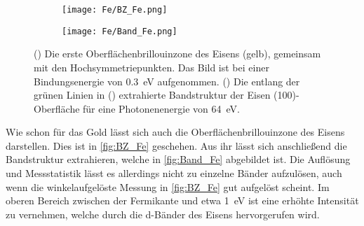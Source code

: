         \begin{figure}
            \begin{subfigure}[t]{0.34\textwidth}
                \centering
                \texttt{[image: Fe/BZ\_Fe.png]}
                \subcaption{}
                \label{fig:BZ_Fe}
            \end{subfigure}
            \begin{subfigure}[t]{0.62\textwidth}
                \centering
                \texttt{[image: Fe/Band\_Fe.png]}
                \subcaption{}
                \label{fig:Band_Fe}
            \end{subfigure}
            \caption{() Die erste Oberflächenbrillouinzone des Eisens (gelb), gemeinsam mit den Hochsymmetriepunkten. Das Bild ist bei einer Bindungsenergie von \SI{0.3}{\electronvolt} aufgenommen.
            () Die entlang der grünen Linien in () extrahierte Bandstruktur der Eisen (100)-Oberfläche für eine Photonenenergie von \SI{64}{\electronvolt}.}
        \end{figure}
        Wie schon für das Gold lässt sich auch die Oberflächenbrillouinzone des Eisens darstellen. 
        Dies ist in \autoref{fig:BZ_Fe} geschehen.
        Aus ihr lässt sich anschließend die Bandstruktur extrahieren, welche in \autoref{fig:Band_Fe} abgebildet ist.
        Die Auflösung und Messstatistik lässt es allerdings nicht zu einzelne Bänder aufzulösen, auch wenn die winkelaufgelöste Messung in \autoref{fig:BZ_Fe} gut aufgelöst scheint. 
        Im oberen Bereich zwischen der Fermikante und etwa \SI{1}{\electronvolt} ist eine erhöhte Intensität zu vernehmen, welche durch die d-Bänder des Eisens hervorgerufen wird.        

